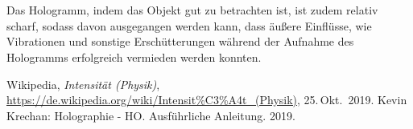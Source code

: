 \documentclass[german,  %
parskip=full,  %
]{scrartcl}
\begin{document}
\\\\
Das Hologramm, indem das Objekt gut zu betrachten ist, ist zudem relativ scharf, sodass davon ausgegangen werden kann, dass äußere Einflüsse, wie Vibrationen und sonstige Erschütterungen während der Aufnahme des Hologramms erfolgreich vermieden werden konnten.


    \begin{thebibliography}{9}
    Wikipedia,
    \emph{Intensität (Physik)},
    \url{https://de.wikipedia.org/wiki/Intensit%C3%A4t_(Physik)},
    25.\,Okt.~2019.
    \bibitem{}
    Kevin Krechan: Holographie - HO. Ausführliche Anleitung. 2019.


    \end{thebibliography}

\end{document}
